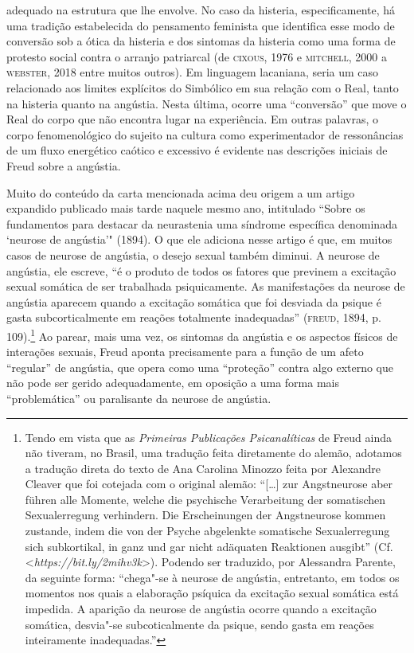adequado na estrutura que lhe envolve. No caso da histeria,
especificamente, há uma tradição estabelecida do pensamento feminista
que identifica esse modo de conversão sob a ótica da histeria e dos
sintomas da histeria como uma forma de protesto social contra o arranjo
patriarcal (de \textsc{cixous}, 1976 e \textsc{mitchell}, 2000 a \textsc{webster}, 2018 entre
muitos outros). Em linguagem lacaniana, seria um caso relacionado aos
limites explícitos do Simbólico em sua relação com o Real, tanto na
histeria quanto na angústia. Nesta última, ocorre uma ``conversão'' que
move o Real do corpo que não encontra lugar na experiência. Em outras
palavras, o corpo fenomenológico do sujeito na cultura como
experimentador de ressonâncias de um fluxo energético caótico e
excessivo é evidente nas descrições iniciais de Freud sobre a angústia.

Muito do conteúdo da carta mencionada acima deu origem a um artigo
expandido publicado mais tarde naquele mesmo ano, intitulado ``Sobre os
fundamentos para destacar da neurastenia uma síndrome específica
denominada `neurose de angústia'" (1894). O que ele adiciona nesse
artigo é que, em muitos casos de neurose de angústia, o desejo sexual
também diminui. A neurose de angústia, ele escreve, ``é o produto de
todos os fatores que previnem a excitação sexual somática de ser
trabalhada psiquicamente. As manifestações da neurose de angústia
aparecem quando a excitação somática que foi desviada da psique é gasta
subcorticalmente em reações totalmente inadequadas'' (\textsc{freud}, 1894, p.
109).\footnote{Tendo em vista que as \emph{Primeiras Publicações
  Psicanalíticas} de Freud ainda não tiveram, no Brasil, uma tradução
  feita diretamente do alemão, adotamos a tradução direta do texto de
  Ana Carolina Minozzo feita por Alexandre Cleaver que foi cotejada com
  o original alemão: ``{[}\ldots{}{]} zur Angstneurose aber führen alle
  Momente, welche die psychische Verarbeitung der somatischen
  Sexualerregung verhindern. Die Erscheinungen der Angstneurose kommen
  zustande, indem die von der Psyche abgelenkte somatische
  Sexualerregung sich subkortikal, in ganz und gar nicht adäquaten
  Reaktionen ausgibt'' (Cf. \textless{}\emph{https://bit.ly/2mihv3k}\textgreater{}).
  Podendo ser traduzido, por Alessandra Parente, da seguinte forma:
  ``chega"-se à neurose de angústia, entretanto, em todos os momentos nos
  quais a elaboração psíquica da excitação sexual somática está
  impedida. A aparição da neurose de angústia ocorre quando a excitação
  somática, desvia"-se subcoticalmente da psique, sendo gasta em reações
  inteiramente inadequadas.''} Ao parear, mais uma vez, os sintomas da
angústia e os aspectos físicos de interações sexuais, Freud aponta
precisamente para a função de um afeto ``regular'' de angústia, que
opera como uma ``proteção'' contra algo externo que não pode ser gerido
adequadamente, em oposição a uma forma mais ``problemática'' ou
paralisante da neurose de angústia.

